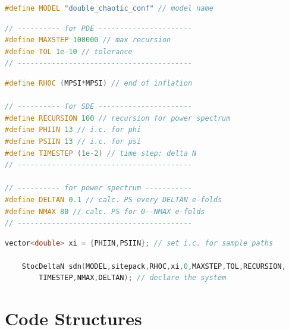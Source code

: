 \documentclass[aps, prd
, preprint
, nofootinbib 
, notitlepage
, superscriptaddress
, longbibliography
]{revtex4-1}
\begin{document}
\begin{lstlisting}[language = C++, caption={\textit{sample/double\_chaotic\_conf.cpp}}, label=list: double_chaotic_conf_otherparams, firstnumber = 4]
#define MODEL "double_chaotic_conf" // model name
\end{lstlisting}
\begin{lstlisting}[language = C++, firstnumber = 15]
// ---------- for PDE ----------------------
#define MAXSTEP 100000 // max recursion
#define TOL 1e-10 // tolerance
// -----------------------------------------
\end{lstlisting}
\begin{lstlisting}[language = C++, firstnumber = 25]
#define RHOC (MPSI*MPSI) // end of inflation

// ---------- for SDE ----------------------
#define RECURSION 100 // recursion for power spectrum
#define PHIIN 13 // i.c. for phi
#define PSIIN 13 // i.c. for psi
#define TIMESTEP (1e-2) // time step: delta N
// -----------------------------------------

// ---------- for power spectrum -----------
#define DELTAN 0.1 // calc. PS every DELTAN e-folds
#define NMAX 80 // calc. PS for 0--NMAX e-folds
// -----------------------------------------
\end{lstlisting}
\begin{lstlisting}[language = C++, firstnumber = 72]
	vector<double> xi = {PHIIN,PSIIN}; // set i.c. for sample paths

	StocDeltaN sdn(MODEL,sitepack,RHOC,xi,0,MAXSTEP,TOL,RECURSION,
		TIMESTEP,NMAX,DELTAN); // declare the system	
\end{lstlisting}



\section{Code Structures}















\end{document}
